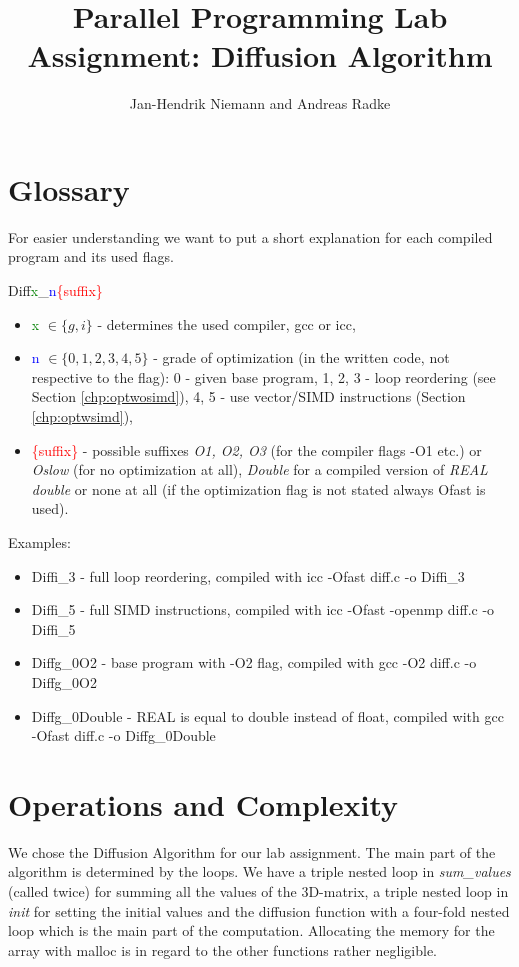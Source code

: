 \documentclass[12pt,a4paper]{article}
\author{Jan-Hendrik Niemann and Andreas Radke}
\title{Parallel Programming Lab Assignment: Diffusion Algorithm}
\begin{document}
	\maketitle
	
	
\section*{Glossary} 
For easier understanding we want to put a short explanation for each compiled program and its used flags. 

Diff\textcolor{green}{x}\_\textcolor{blue}{n}\textcolor{red}{\{suffix\}}
\begin{itemize}
\item \textcolor{green}{x} $ \in \{g,i\} $ - determines the used compiler, gcc or icc,
\item \textcolor{blue}{n} $ \in \{0,1,2,3,4,5\} $ - grade of optimization (in the written code, not respective to the flag): 0 - given base program, 1, 2, 3 - loop reordering (see Section \ref{chp:optwosimd}), 4, 5 - use vector/SIMD instructions (Section \ref{chp:optwsimd}),
\item \textcolor{red}{\{suffix\}} - possible suffixes \emph{O1, O2, O3} (for the compiler flags -O1 etc.) or \emph{Oslow} (for no optimization at all), \emph{Double} for a compiled version of \emph{REAL double} or none at all (if the optimization flag is not stated always Ofast is used).
\end{itemize}

Examples:
\begin{itemize}
\item Diffi\_3 - full loop reordering, compiled with icc -Ofast diff.c -o Diffi\_3  
\item Diffi\_5 - full SIMD instructions, compiled with icc -Ofast -openmp diff.c -o Diffi\_5 
\item Diffg\_0O2 - base program with -O2 flag, compiled with gcc -O2 diff.c -o Diffg\_0O2
\item Diffg\_0Double - REAL is equal to double instead of float, compiled with gcc -Ofast diff.c -o Diffg\_0Double
\end{itemize} 
 

\section{Operations and Complexity}\label{chp:opcom}

We chose the Diffusion Algorithm for our lab assignment.
The main part of the algorithm is determined by the loops. We have a triple nested loop in \emph{sum\_values} (called twice) for summing all the values of the 3D-matrix, a triple nested loop in \emph{init} for setting the initial values and the diffusion function with a four-fold nested loop which is the main part of the computation. Allocating the memory for the array with malloc is in regard to the other functions rather negligible. 
\end{document}
